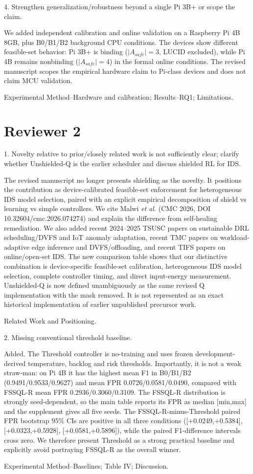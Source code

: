 \documentclass[11pt,a4paper]{article}
\newcommand{\commentbox}[1]{\begin{rcommentbox}#1\end{rcommentbox}}
\newcommand{\responsebox}[1]{\begin{authorresponsebox}#1\end{authorresponsebox}}
\newcommand{\changebox}[1]{\begin{wherebox}#1\end{wherebox}}
\begin{document}
\commentbox{4. Strengthen generalization/robustness beyond a single Pi 3B+ or scope the claim.}
\responsebox{We added independent calibration and online validation on a Raspberry Pi 4B 8GB, plus B0/B1/B2 background CPU conditions. The devices show different feasible-set behavior: Pi 3B+ is binding ($|A_{safe}|=3$, LUCID excluded), while Pi 4B remains nonbinding ($|A_{safe}|=4$) in the formal online conditions. The revised manuscript scopes the empirical hardware claim to Pi-class devices and does not claim MCU validation.}
\changebox{Experimental Method--Hardware and calibration; Results--RQ1; Limitations.}

\section*{Reviewer 2}

\commentbox{1. Novelty relative to prior/closely related work is not sufficiently clear; clarify whether Unshielded-Q is the earlier scheduler and discuss shielded RL for IDS.}
\responsebox{The revised manuscript no longer presents shielding as the novelty. It positions the contribution as device-calibrated feasible-set enforcement for heterogeneous IDS model selection, paired with an explicit empirical decomposition of shield vs learning vs simple controllers. We cite Malwi \emph{et al.} (CMC 2026, DOI 10.32604/cmc.2026.074274) and explain the difference from self-healing remediation. We also added recent 2024--2025 TSUSC papers on sustainable DRL scheduling/DVFS and IoT anomaly adaptation, recent TMC papers on workload-adaptive edge inference and DVFS/offloading, and recent TIFS papers on online/open-set IDS. The new comparison table shows that our distinctive combination is device-specific feasible-set calibration, heterogeneous IDS model selection, complete controller timing, and direct input-energy measurement. Unshielded-Q is now defined unambiguously as the same revised Q implementation with the mask removed. It is not represented as an exact historical implementation of earlier unpublished precursor work.}
\changebox{Related Work and Positioning.}

\commentbox{2. Missing conventional threshold baseline.}
\responsebox{Added. The Threshold controller is no-training and uses frozen development-derived temperature, backlog and risk thresholds. Importantly, it is not a weak straw-man: on Pi 4B it has the highest mean F1 in B0/B1/B2 (0.9491/0.9533/0.9627) and mean FPR 0.0726/0.0581/0.0490, compared with FSSQL-R mean FPR 0.2936/0.3060/0.3109. The FSSQL-R distribution is strongly seed-dependent, so the main table reports its FPR as median [min,max] and the supplement gives all five seeds. The FSSQL-R-minus-Threshold paired FPR bootstrap 95\% CIs are positive in all three conditions ([+0.0249,+0.5384], [+0.0323,+0.5928], [+0.0581,+0.5896]), while the paired F1-difference intervals cross zero. We therefore present Threshold as a strong practical baseline and explicitly avoid portraying FSSQL-R as the overall winner.}
\changebox{Experimental Method--Baselines; Table IV; Discussion.}
\end{document}
